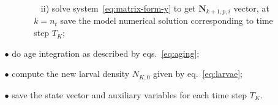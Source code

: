 \begin{itemize}
\begin{itemize}
\begin{itemize}
\begin{itemize}
               \item[] \mbox{ } ii) solve system~\eqref{eq:matrix-form-y} to get $\mathbf{N}_{k+1,p,i}$ vector, at $k=n_t$ save the model numerical solution corresponding to time step $T_K$;
          \end{itemize}
     \end{itemize}
  \item[$\bullet$] do age integration as described by eqs.~\eqref{eq:aging};     
  \item[$\bullet$] compute the new larval density $N_{K,0}$ given by eq.~\eqref{eq:larvae};
  \item[$\bullet$] save the state vector and auxiliary variables for each time step $T_K$.  
  \end{itemize}
\end{itemize}  





